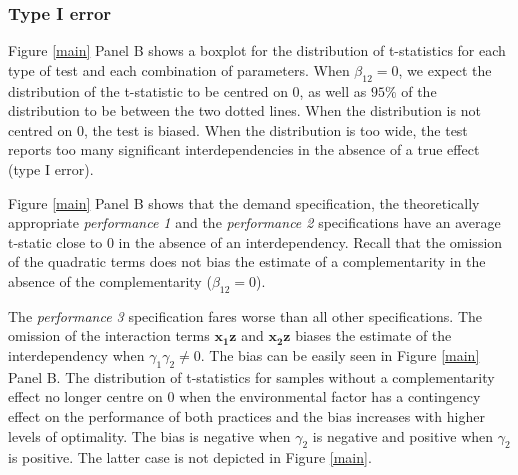 \documentclass[12pt]{article}
\begin{document}
\subsubsection{Type I error}\label{Type I error}
Figure \ref{main} Panel B shows a boxplot for the distribution of t-statistics for each type of test and each combination of parameters. When $\beta_{12} = 0$, we expect the distribution of the t-statistic to be centred on $0$, as well as $95\%$ of the distribution to be between the two dotted lines. When the distribution is not centred on $0$, the test is biased. When the distribution is too wide, the test reports too many significant interdependencies in the absence of a true effect (type I error).

Figure \ref{main} Panel B shows that the demand specification, the theoretically appropriate \emph{performance 1} and the \emph{performance 2} specifications have an average t-static close to 0 in the absence of an interdependency. Recall that the omission of the quadratic terms does not bias the estimate of a complementarity in the absence of the complementarity ($\beta_{12} = 0$).

The \emph{performance 3} specification fares worse than all other specifications. The omission of the interaction terms \(\mathbf{x_1z}\) and \(\mathbf{x_2z}\) biases the estimate of the interdependency when $\gamma_1 \gamma_2 \neq 0$. The bias can be easily seen in Figure \ref{main} Panel B. The distribution of t-statistics for samples without a complementarity effect no longer centre on $0$ when the environmental factor has a contingency effect on the performance of both practices and the bias increases with higher levels of optimality. The bias is negative when $\gamma_2$ is negative and positive when $\gamma_2$ is positive. The latter case is not depicted in Figure \ref{main}.
\end{document}
